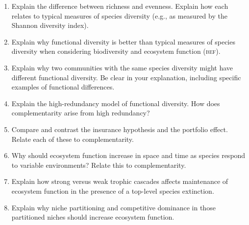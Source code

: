 \documentclass[letterpaper]{tufte-handout}
\newcommand\lecturefile{434_lecture05_instructor}
\begin{document}
\begin{enumerate}

	\item Explain the difference between richness and evenness. Explain how each relates to typical measures of species diversity (e.g., as measured by the Shannon diversity index).
	
	\item Explain why functional diversity is better than typical measures of species diversity when considering biodiversity and ecosystem function (\textsc{bef}).
	
	\item Explain%
	 why two communities with the same species diversity might have different functional diversity. Be clear in your explanation, including specific examples of functional differences.
	

	\item Explain the high-redundancy model of functional diversity. How does complementarity arise from high redundancy? 
	

	\item Compare and contrast the insurance hypothesis and the portfolio effect. Relate each of these to complementarity.
	
	\item Why should ecosystem function increase in space and time as species respond to variable environments? Relate this to complementarity.

	\item Explain how strong versus weak trophic cascades affects maintenance of ecosystem function in the presence of a top-level species extinction.
	
	\item Explain why niche partitioning and competitive dominance in those partitioned niches should increase ecosystem function.
	

\end{enumerate}
\end{document}
